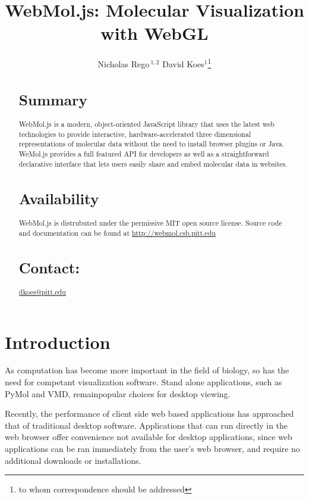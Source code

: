 \documentclass[]{bioinfo}
\begin{document}

\title[WebMol.js: Molecular Visualization with WebGL]{WebMol.js: Molecular Visualization with WebGL}
\author{Nicholas Rego\,$^{1,2}$ David Koes$^{1}$\footnote{to whom correspondence should be addressed}}
\address{$^{1}$Department of Computational and Systems Biology, University of Pittsburgh, Pittsburgh, PA 15260\\
$^{2}$Department of XXXXXXXX, Address XXXX etc.}



\maketitle
\begin{abstract}
\section{Summary} WebMol.js is a modern, object-oriented JavaScript library that uses the latest web technologies
to provide interactive, hardware-accelerated three dimensional representations of molecular data without the
need to install browser plugins or Java.  WeMol.js provides a full featured API for developers as well
as a straightforward declarative interface that lets users easily share and embed molecular data in websites.
\section{Availability} WebMol.js is distrubuted under the permissive MIT open source license.
Source code and documentation can be found at \url{http://webmol.csb.pitt.edu}
\section{Contact:} \href{dkoes@pitt.edu}{dkoes@pitt.edu}
\end{abstract}

\section{Introduction}
As computation has become more important in the field of biology, so has the need for competant visualization software. Stand alone applications, such as PyMol and VMD, remainpopular choices for desktop viewing.  

Recently, the performance of client side web based applications has approached that of traditional desktop software. Applications that can run directly in the web browser offer convenience not available for desktop applications, since web applications can be ran immediately from the user's web browser, and require no additional downloads or installations.
\end{document}
